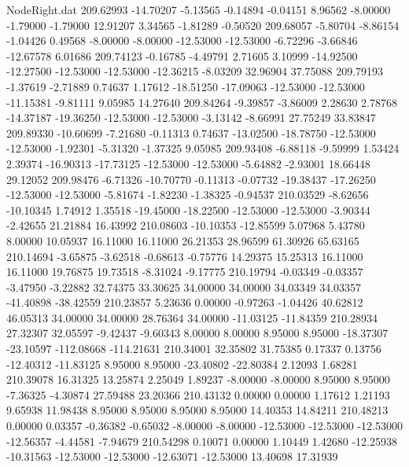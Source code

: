 \begin{filecontents}{NodeRight.dat}
 209.62993  -14.70207   -5.13565    -0.14894   -0.04151    8.96562   -8.00000   -1.79000   -1.79000   12.91207    3.34565   -1.81289   -0.50520
 209.68057   -5.80704   -8.86154    -1.04426    0.49568   -8.00000   -8.00000  -12.53000  -12.53000   -6.72296   -3.66846  -12.67578    6.01686
 209.74123   -0.16785   -4.49791     2.71605    3.10999  -14.92500  -12.27500  -12.53000  -12.53000  -12.36215   -8.03209   32.96904   37.75088
 209.79193   -1.37619   -2.71889     0.74637    1.17612  -18.51250  -17.09063  -12.53000  -12.53000  -11.15381   -9.81111    9.05985   14.27640
 209.84264   -9.39857   -3.86009     2.28630    2.78768  -14.37187  -19.36250  -12.53000  -12.53000   -3.13142   -8.66991   27.75249   33.83847
 209.89330  -10.60699   -7.21680    -0.11313    0.74637  -13.02500  -18.78750  -12.53000  -12.53000   -1.92301   -5.31320   -1.37325    9.05985
 209.93408   -6.88118   -9.59999     1.53424    2.39374  -16.90313  -17.73125  -12.53000  -12.53000   -5.64882   -2.93001   18.66448   29.12052
 209.98476   -6.71326  -10.70770    -0.11313   -0.07732  -19.38437  -17.26250  -12.53000  -12.53000   -5.81674   -1.82230   -1.38325   -0.94537
 210.03529   -8.62656  -10.10345     1.74912    1.35518  -19.45000  -18.22500  -12.53000  -12.53000   -3.90344   -2.42655   21.21884   16.43992
 210.08603  -10.10353  -12.85599     5.07968    5.43780    8.00000   10.05937   16.11000   16.11000   26.21353   28.96599   61.30926   65.63165
 210.14694   -3.65875   -3.62518    -0.68613   -0.75776   14.29375   15.25313   16.11000   16.11000   19.76875   19.73518   -8.31024   -9.17775
 210.19794   -0.03349   -0.03357    -3.47950   -3.22882   32.74375   33.30625   34.00000   34.00000   34.03349   34.03357  -41.40898  -38.42559
 210.23857    5.23636    0.00000    -0.97263   -1.04426   40.62812   46.05313   34.00000   34.00000   28.76364   34.00000  -11.03125  -11.84359
 210.28934   27.32307   32.05597    -9.42437   -9.60343    8.00000    8.00000    8.95000    8.95000  -18.37307  -23.10597 -112.08668 -114.21631
 210.34001   32.35802   31.75385     0.17337    0.13756  -12.40312  -11.83125    8.95000    8.95000  -23.40802  -22.80384    2.12093    1.68281
 210.39078   16.31325   13.25874     2.25049    1.89237   -8.00000   -8.00000    8.95000    8.95000   -7.36325   -4.30874   27.59488   23.20366
 210.43132    0.00000    0.00000     1.17612    1.21193    9.65938   11.98438    8.95000    8.95000    8.95000    8.95000   14.40353   14.84211
 210.48213    0.00000    0.03357    -0.36382   -0.65032   -8.00000   -8.00000  -12.53000  -12.53000  -12.53000  -12.56357   -4.44581   -7.94679
 210.54298    0.10071    0.00000     1.10449    1.42680  -12.25938  -10.31563  -12.53000  -12.53000  -12.63071  -12.53000   13.40698   17.31939

\end{filecontents}
